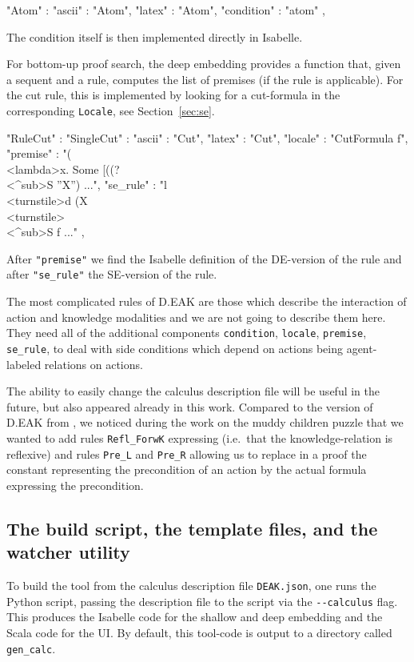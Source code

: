 \documentclass[runningheads,a4paper]{llncs}
\begin{document}
\begin{pyglist}[language = json]
"Atom" : {
  "ascii" : "Atom",
  "latex" : "Atom",
  "condition" : "atom"			
},
\end{pyglist}
\noindent The condition itself is then implemented directly in Isabelle. 

For bottom-up proof search, the deep embedding provides a function that, given a sequent and a rule, computes the list of premises (if the rule is applicable). For the cut rule, this is implemented by looking for a cut-formula in the corresponding \texttt{Locale}, see Section~\ref{sec:se}.

\begin{pyglist}[language = json]
"RuleCut" : {
 "SingleCut" : {
  "ascii" : "Cut",
  "latex" : "Cut",
  "locale" : "CutFormula f",
  "premise" : "(\\<lambda>x. Some [((?\\<^sub>S ''X'') ...",
  "se_rule" : "l \\<turnstile>d (X \\<turnstile>\\<^sub>S f ..."
  }
 },
\end{pyglist}
\noindent After \texttt{"premise"} we find the Isabelle definition of the DE-version of the rule and after \texttt{"se\_rule"} the SE-version of the rule.

The most complicated rules of D.EAK are those  which describe the interaction of action and knowledge modalities and we are not going to describe them here. They need all of the additional components \texttt{condition}, \texttt{locale}, \texttt{premise}, 
\texttt{se\_rule}, to deal with side conditions which depend on actions being agent-labeled relations on actions.

The ability to easily change the calculus description file will be useful in the future, but also appeared already in this work. Compared to the version of D.EAK from \cite{DEAK}, we noticed during the work on the muddy children puzzle that we wanted to add rules \texttt{Refl\_ForwK} expressing  (i.e.\ that the knowledge-relation is reflexive) and rules \texttt{Pre\_L} and \texttt{Pre\_R} allowing us to replace in a proof the constant representing the precondition of an action by the actual formula expressing the precondition.


\subsection{The build script, the template files, and the watcher utility}
To build the tool from the calculus description file \texttt{DEAK.json}, one runs the Python script, passing the description file to the script via the \texttt{-{}-calculus} flag. This produces the Isabelle code for the shallow and deep embedding and the Scala code for the UI. By default, this tool-code is output to a directory called \texttt{gen\_calc}. 
\end{document}
